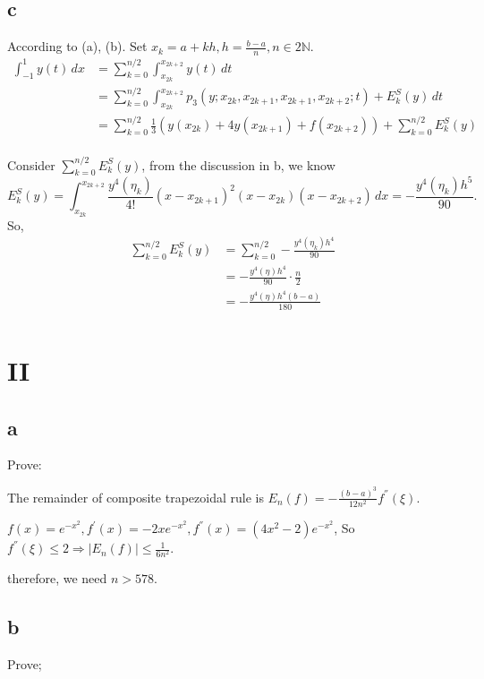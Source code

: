 \documentclass[a4paper]{article}
\begin{document}
\subsection*{c}
According to (a), (b). Set $x_{k} = a + kh, h = \frac{b-a}{n}, n \in 2\mathbb{N} $.
\begin{align}
    \int_{-1}^{1} y(t) \,dx &= \sum_{k = 0}^{n/2} \int_{x_{2k}}^{x_{2k+2}} y(t) \,dt \\ 
                            &= \sum_{k = 0}^{n/2} \int_{x_{2k}}^{x_{2k+2}} 
                            p_{3}(y;x_{2k},x_{2k+1},x_{2k+1}, x_{2k+2};t) + E_{k}^{S}(y) \,dt\\
                            &= \sum_{k = 0}^{n/2} \frac{1}{3}(y(x_{2k}) + 4y (x_{2k+1}) + f(x_{2k+2})) + \sum_{k=0}^{n/2} E_{k}^{S}(y)  \\
\end{align}

Consider $\sum_{k=0}^{n/2} E_{k}^{S}(y)$, from the discussion in b, 
we know $$ E_{k}^{S}(y)=\int_{x_{2k}}^{x_{2k+2}} \frac{y^{4}(\eta_{k})}{4!}(x-x_{2k+1})^{2}(x-x_{2k})(x-x_{2k+2}) \,dx 
        = -\frac{y^{4}(\eta_{k} )h^{5}}{90}.$$So,
\begin{align}
    \sum_{k=0}^{n/2} E_{k}^{S}(y) &= \sum_{k=0}^{n/2} -\frac{y^{4}(\eta_{k} )h^{4}}{90} \\
                                  &= -\frac{y^{4}(\eta )h^{4}}{90}\cdot \frac{n}{2} \\
                                  &= -\frac{y^{4}(\eta )h^{4}(b-a)}{180} \\
\end{align}



\section*{II}
\subsection*{a}
Prove:

The remainder of composite trapezoidal rule is $E_{n}(f) = -\frac{(b-a)^{3}}{12n^{2}}f^{''}(\xi)$.

$f(x) = e^{-x^{2}}, f^{'}(x) = -2xe^{-x^{2}}, f^{''}(x) = (4x^{2} - 2)e^{-x^{2}}$, 
So $f^{''}(\xi) \leq 2 \Rightarrow \left\lvert E_{n}(f)\right\rvert  \leq \frac{1}{6n^{2}}$.

therefore, we need $n>578$.

\subsection*{b}
Prove;
\end{document}
